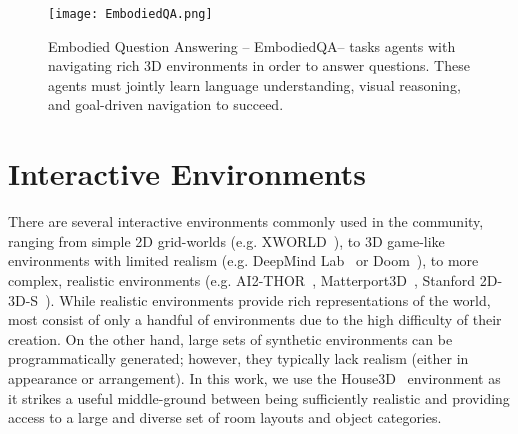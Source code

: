 \documentclass[10pt,twocolumn,letterpaper]{article}
\begin{document}
\begin{figure}[!htb]
\begin{center}
   \texttt{[image: EmbodiedQA.png]}
\end{center}
   \caption{Embodied Question Answering – EmbodiedQA– tasks
agents with navigating rich 3D environments in order to answer
questions. These agents must jointly learn language understanding,
visual reasoning, and goal-driven navigation to succeed.}
\label{fig:EmbodiedQA}
\end{figure}

\section{Interactive Environments} 
There are several interactive
environments commonly used in the community, ranging
from simple 2D grid-worlds (e.g. XWORLD~\cite{Haonan2017}), to 3D
game-like environments with limited realism (e.g. DeepMind
Lab~\cite{Charles2016Lab} or Doom~\cite{Chaplot2017Gated}), to more complex, realistic
environments (e.g. AI2-THOR~\cite{Zhu2017Visual}, Matterport3D~\cite{Anderson2017Vision},
Stanford 2D-3D-S~\cite{Armeni2017Joint}). While realistic environments provide
rich representations of the world, most consist of only
a handful of environments due to the high difficulty of their
creation. On the other hand, large sets of synthetic environments
can be programmatically generated; however,
they typically lack realism (either in appearance or arrangement).
In this work, we use the House3D~\cite{Wu2018Building} environment as
it strikes a useful middle-ground between being sufficiently
realistic and providing access to a large and diverse set of
room layouts and object categories. 

{\small


}
\end{document}
